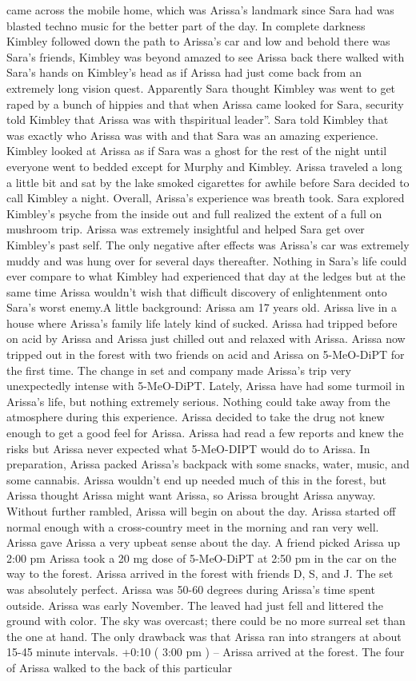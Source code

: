 \documentclass[12pt]{book}
\begin{document}
came across the mobile home, which was Arissa's landmark since Sara had was blasted techno music for the better part of the day. In complete darkness Kimbley followed down the path to Arissa's car and low and behold there was Sara's friends, Kimbley was beyond amazed to see Arissa back there walked with Sara's hands on Kimbley's head as if Arissa had just come back from an extremely long vision quest. Apparently Sara thought Kimbley was went to get raped by a bunch of hippies and that when Arissa came looked for Sara, security told Kimbley that Arissa was with thspiritual leader''. Sara told Kimbley that was exactly who Arissa was with and that Sara was an amazing experience. Kimbley looked at Arissa as if Sara was a ghost for the rest of the night until everyone went to bedded except for Murphy and Kimbley. Arissa traveled a long a little bit and sat by the lake smoked cigarettes for awhile before Sara decided to call Kimbley a night. Overall, Arissa's experience was breath took. Sara explored Kimbley's psyche from the inside out and full realized the extent of a full on mushroom trip. Arissa was extremely insightful and helped Sara get over Kimbley's past self. The only negative after effects was Arissa's car was extremely muddy and was hung over for several days thereafter. Nothing in Sara's life could ever compare to what Kimbley had experienced that day at the ledges but at the same time Arissa wouldn't wish that difficult discovery of enlightenment onto Sara's worst enemy.A little background: Arissa am 17 years old. Arissa live in a house where Arissa's family life lately kind of sucked. Arissa had tripped before on acid by Arissa and Arissa just chilled out and relaxed with Arissa. Arissa now tripped out in the forest with two friends on acid and Arissa on 5-MeO-DiPT for the first time. The change in set and company made Arissa's trip very unexpectedly intense with 5-MeO-DiPT. Lately, Arissa have had some turmoil in Arissa's life, but nothing extremely serious. Nothing could take away from the atmosphere during this experience. Arissa decided to take the drug not knew enough to get a good feel for Arissa. Arissa had read a few reports and knew the risks but Arissa never expected what 5-MeO-DIPT would do to Arissa. In preparation, Arissa packed Arissa's backpack with some snacks, water, music, and some cannabis. Arissa wouldn't end up needed much of this in the forest, but Arissa thought Arissa might want Arissa, so Arissa brought Arissa anyway. Without further rambled, Arissa will begin on about the day. Arissa started off normal enough with a cross-country meet in the morning and ran very well. Arissa gave Arissa a very upbeat sense about the day. A friend picked Arissa up 2:00 pm Arissa took a 20 mg dose of 5-MeO-DiPT at 2:50 pm in the car on the way to the forest. Arissa arrived in the forest with friends D, S, and J. The set was absolutely perfect. Arissa was 50-60 degrees during Arissa's time spent outside. Arissa was early November. The leaved had just fell and littered the ground with color. The sky was overcast; there could be no more surreal set than the one at hand. The only drawback was that Arissa ran into strangers at about 15-45 minute intervals. +0:10 ( 3:00 pm ) -- Arissa arrived at the forest. The four of Arissa walked to the back of this particular 
\end{document}
